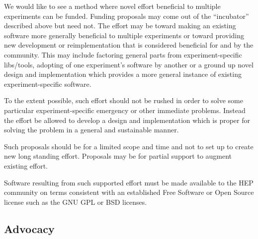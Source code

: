 We would like to see a method where novel effort beneficial to 
multiple experiments can be funded.
Funding proposals may come out of the ``incubator'' described above but need not.
The effort may be toward making an existing software more generally
beneficial to multiple experiments
or toward providing new development or reimplementation that is 
considered beneficial for and by the community.  This may include factoring
general parts from experiment-specific libs/tools, adopting of one
experiment's software by another or a ground up novel design and
implementation which provides a more general instance of existing
experiment-specific software.

To the extent possible, such effort should not be rushed in order to solve
some particular experiment-specific emergency or other immediate problems.  
Instead the effort be allowed to develop
a design and implementation which is proper for solving the problem in
a general and sustainable manner.

Such proposals should be for a limited scope and time and not to set
up to create new long standing effort.  Proposals may be for partial
support to augment existing effort.

Software resulting from such supported effort must be made available
to the HEP community on terms consistent with an  established
Free Software or Open Source license such as the GNU GPL or BSD licenses.

\subsection{Advocacy}


